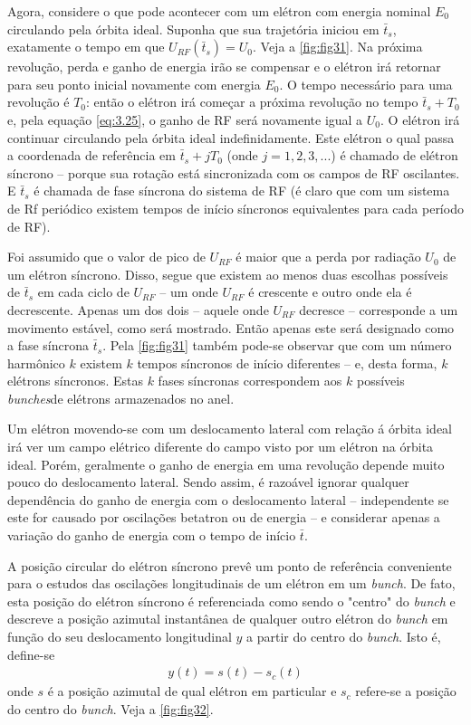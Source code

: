Agora, considere o que pode acontecer com um elétron com energia nominal $E_0$ circulando pela órbita ideal. Suponha que sua trajetória iniciou em $\bar{t}_s$, exatamente o tempo em que $U_{RF}(\bar{t}_s) = U_0$. Veja a \autoref{fig:fig31}. Na próxima revolução, perda e ganho de energia irão se compensar e o elétron irá retornar para seu ponto inicial novamente com energia $E_0$. O tempo necessário para uma revolução é $T_0$: então o elétron irá começar a próxima revolução no tempo $\bar{t}_s + T_0$ e, pela equação \eqref{eq:3.25}, o ganho de RF será novamente igual a $U_0$. O elétron irá continuar circulando pela órbita ideal indefinidamente. Este elétron o qual passa a coordenada de referência em $\bar{t}_s+jT_0$ (onde $j=1,2,3,...$) é chamado de elétron síncrono -- porque sua rotação está sincronizada com os campos de RF oscilantes. E $\bar{t}_s$ é chamada de fase síncrona do sistema de RF (é claro que com um sistema de Rf periódico existem tempos de início síncronos equivalentes para cada período de RF).

Foi assumido que o valor de pico de $U_{RF}$ é maior que a perda por radiação $U_0$ de um elétron síncrono. Disso, segue que existem ao menos duas escolhas possíveis de $\bar{t}_s$ em cada ciclo de $U_{RF}$ -- um onde $U_{RF}$ é crescente e outro onde ela é decrescente. Apenas um dos dois -- aquele onde $U_{RF}$ decresce -- corresponde a um movimento estável, como será mostrado. Então apenas este será designado como a fase síncrona $\bar{t}_s$. Pela \autoref{fig:fig31} também pode-se observar que com um número harmônico $k$ existem $k$ tempos síncronos de início diferentes -- e, desta forma, $k$ elétrons síncronos. Estas $k$ fases síncronas correspondem aos $k$ possíveis \textit{bunches}de elétrons armazenados no anel.

Um elétron movendo-se com um deslocamento lateral com relação á órbita ideal irá ver um campo elétrico diferente do campo visto por um elétron na órbita ideal. Porém, geralmente o ganho de energia em uma revolução depende muito pouco do deslocamento lateral. Sendo assim, é razoável ignorar qualquer dependência do ganho de energia com o deslocamento lateral -- independente se este for causado por oscilações betatron ou de energia -- e considerar apenas a variação do ganho de energia com o tempo de início $\bar{t}$.

A posição circular do elétron síncrono prevê um ponto de referência conveniente para o estudos das oscilações longitudinais de um elétron em um \textit{bunch}. De fato, esta posição  do elétron síncrono é referenciada como sendo o "centro"  do \textit{bunch} e descreve a posição azimutal instantânea de qualquer outro elétron do \textit{bunch} em função do seu deslocamento longitudinal $y$ a partir do centro do \textit{bunch}. Isto é, define-se
\begin{align}
	y(t) = s(t) - s_c(t)
\end{align}
onde $s$ é a posição azimutal de qual elétron em particular e $s_c$ refere-se a posição do centro do \textit{bunch}. Veja a \autoref{fig:fig32}.

